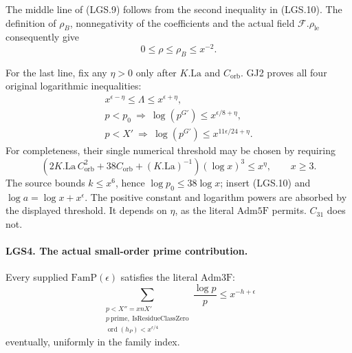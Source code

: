 \documentclass[11pt,a4paper]{article}
\numberwithin{equation}{section}
\theoremstyle{remark}\newtheorem{remark}[theorem]{Remark}
\begin{document}
The middle line of (LGS.9) follows from the second inequality
in (LGS.10).  The definition of \(\rho_B\), nonnegativity of
the coefficients and the actual field
\(\mathcal F.\rho_{\mathrm{le}}\) consequently give
\[
              0\le\rho\le\rho_B\le x^{-2}.             \tag{LGS.11}
\]

For the last line, fix any \(\eta>0\) only after
\(K.\mathrm{La}\) and \(C_{\mathrm{orb}}\).  GJ2 proves all
four original logarithmic inequalities:
\[
 \begin{gathered}
 x^{\epsilon-\eta}\le\Lambda\le x^{\epsilon+\eta},\\
 p<p_0\ \Longrightarrow\ \log(p^{G'})
                       \le x^{\epsilon/8+\eta},\\
 p<X'\ \Longrightarrow\ \log(p^{G'})
                       \le x^{11\epsilon/24+\eta}.
 \end{gathered}                                                   \tag{LGS.12}
\]
For completeness, their single numerical threshold may be
chosen by requiring
\[
 (2K.\mathrm{La}\,C_{\mathrm{orb}}^2
       +38C_{\mathrm{orb}}+(K.\mathrm{La})^{-1})
                  (\log x)^3\le x^\eta,\qquad x\ge3.
 \]
The source bounds \(k\le x^6\), hence
\(\log p_0\le38\log x\); insert (LGS.10) and
\(\log a=\log x+x^\epsilon\).
The positive constant and logarithm powers are absorbed by
the displayed threshold.  It depends on \(\eta\), as the
literal \(\mathrm{Adm5F}\) permits.  \(C_{31}\) does not.

\paragraph{LGS4. The actual small-order prime contribution.}
\label{claim:LGS4}
Every supplied \(\mathrm{FamP}(\epsilon)\) satisfies the
literal \(\mathrm{Adm3F}\):
\[
 \sum_{\substack{p<X''=xnX'\\p\ \mathrm{prime},\
                      \mathrm{IsResidueClassZero}\\
                 \operatorname{ord}(h_P)<x^{\epsilon/4}}}
                    \frac{\log p}{p}
              \le x^{-h+\epsilon}                      \tag{LGS.13}
\]
eventually, uniformly in the family index.
\end{document}
